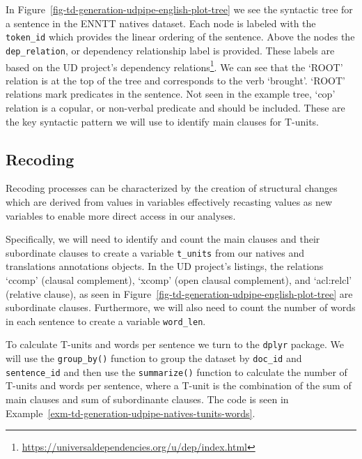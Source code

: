 \documentclass[
  letterpaper,
]{latex/krantz}
\theoremstyle{definition}
\theoremstyle{remark}
\DeclareRobustCommand{\href}[2]{#2\footnote{\url{#1}}}
\begin{document}
In Figure~\ref{fig-td-generation-udpipe-english-plot-tree} we see the
syntactic tree for a sentence in the ENNTT natives dataset. Each node is
labeled with the \texttt{token\_id} which provides the linear ordering
of the sentence. Above the nodes the \texttt{dep\_relation}, or
dependency relationship label is provided. These labels are based on the
UD project's
\href{https://universaldependencies.org/u/dep/index.html}{dependency
relations}. We can see that the `ROOT' relation is at the top of the
tree and corresponds to the verb `brought'. `ROOT' relations mark
predicates in the sentence. Not seen in the example tree, `cop' relation
is a copular, or non-verbal predicate and should be included. These are
the key syntactic pattern we will use to identify main clauses for
T-units.

\subsection{Recoding}\label{sec-td-recoding}

Recoding processes can be characterized by the creation of structural
changes which are derived from values in variables effectively recasting
values as new variables to enable more direct access in our analyses.

Specifically, we will need to identify and count the main clauses and
their subordinate clauses to create a variable \texttt{t\_units} from
our natives and translations annotations objects. In the UD project's
listings, the relations `ccomp' (clausal complement), `xcomp' (open
clausal complement), and `acl:relcl' (relative clause), as seen in
Figure~\ref{fig-td-generation-udpipe-english-plot-tree} are subordinate
clauses. Furthermore, we will also need to count the number of words in
each sentence to create a variable \texttt{word\_len}.

To calculate T-units and words per sentence we turn to the
\texttt{dplyr} package. We will use the \texttt{group\_by()} function to
group the dataset by \texttt{doc\_id} and \texttt{sentence\_id} and then
use the \texttt{summarize()} function to calculate the number of T-units
and words per sentence, where a T-unit is the combination of the sum of
main clauses and sum of subordinante clauses. The code is seen in
Example~\ref{exm-td-generation-udpipe-natives-tunits-words}.
\end{document}
